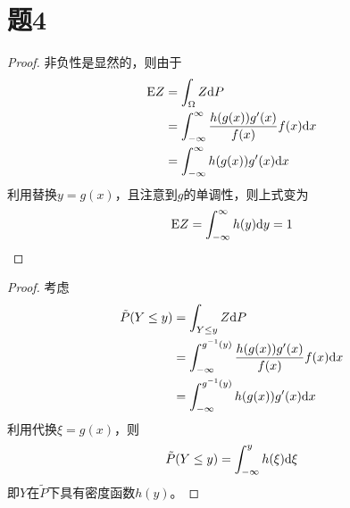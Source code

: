 \documentclass[cn]{homework}
\begin{document}
    \section{题4}
    \begin{subproblem}[(\arabic*)]
        \item
        \begin{proof}
            非负性是显然的，则由于
            \[\begin{aligned}
                \mathrm EZ&=\int_\Omega Z\mathrm d P\\
                &=\int_{-\infty}^\infty\frac{h(g(x))g'(x)}{f(x)}f(x)\mathrm d x\\
                &=\int_{-\infty}^\infty h(g(x))g'(x)\mathrm d x
            \end{aligned}\]
            利用替换$y=g(x)$，且注意到$g$的单调性，则上式变为
            \[\mathrm EZ=\int_{-\infty}^\infty h(y)\mathrm d y=1\]
        \end{proof}

        \item
        \begin{proof}
            考虑
            \[\begin{aligned}
                \tilde P(Y\leq y)&=\int_{Y\leq y}Z\mathrm d P\\
                &=\int_{-\infty}^{g^{-1}(y)}
                \frac{h(g(x))g'(x)}{f(x)}f(x)\mathrm d x\\
                &=\int^{g^{-1}(y)}_{-\infty}h(g(x))g'(x)\mathrm d x\\
            \end{aligned}\]
            利用代换$\xi=g(x)$，则
            \[\tilde P(Y\leq y)=\int_{-\infty}^yh(\xi)\mathrm d\xi\]
            即$Y$在$\tilde P$下具有密度函数$h(y)$。
        \end{proof}
    \end{subproblem}
\end{document}
